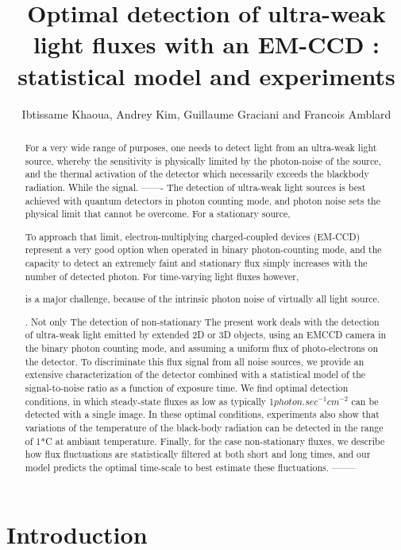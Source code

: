\documentclass{article}
\title{Optimal detection of ultra-weak light fluxes with an EM-CCD : statistical model and experiments}
\author{Ibtissame Khaoua, Andrey Kim, Guillaume Graciani and Francois Amblard }
\begin{document}
\maketitle

\begin{abstract}
For a very wide range of purposes, one needs to detect light from an ultra-weak light source, whereby the sensitivity is physically limited by the photon-noise of the source, and the thermal activation of the detector which necessarily exceeds the blackbody radiation.
While the signal.
-------
The detection of ultra-weak light sources is best achieved with quantum detectors in photon counting mode, and photon noise sets the physical limit that cannot be overcome. 
For a stationary source, 

To approach that limit, electron-multiplying charged-coupled devices (EM-CCD) represent a very good option when operated in binary photon-counting mode, and the capacity to detect an extremely faint and stationary flux simply increases with the number of detected photon.  
For time-varying light fluxes however, 

is a major challenge, because of the intrinsic photon noise of virtually all light source.  

. Not only  
The detection of non-stationary The present work deals with the detection of ultra-weak light emitted by extended 2D or 3D objects, using an EMCCD camera in the binary photon counting mode, and assuming a uniform flux of photo-electrons on the detector.
To discriminate this flux signal from all noise sources, we provide an extensive characterization of the detector combined with a statistical model of the signal-to-noise ratio as a function of exposure time.
We find optimal detection conditions, in which steady-state fluxes as low as typically 1$photon.sec^{-1} cm^{-2}$ can be detected with a single image.
In these optimal conditions, experiments also show that variations of the temperature of the black-body radiation can be detected in the range of 1*C at ambiant temperature.
Finally, for the case non-stationary fluxes, we describe how flux fluctuations are statistically filtered at both short and long times, and our model predicts the optimal time-scale to best estimate these fluctuations.
--------
\end{abstract}


\section*{Introduction}
\end{document}
